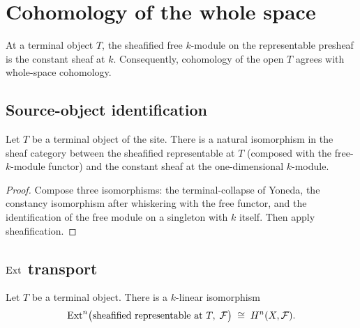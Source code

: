 \section{Cohomology of the whole space}
\label{mk-sec:cover_totality}

At a terminal object \(T\), the sheafified free \(k\)-module on the representable presheaf is the constant sheaf at \(k\). Consequently, cohomology of the open \(T\) agrees with whole-space cohomology.

\subsection{Source-object identification}

\begin{definition}\label{mk-def:Scheme_HModule_prime_top_sourceIso}
  \leanok


  Let \(T\) be a terminal object of the site. There is a natural isomorphism in the sheaf category between the sheafified representable at \(T\) (composed with the free-\(k\)-module functor) and the constant sheaf at the one-dimensional \(k\)-module.
\end{definition}

\begin{proof}
  \leanok


Compose three isomorphisms: the terminal-collapse of Yoneda, the constancy isomorphism after whiskering with the free functor, and the identification of the free module on a singleton with \(k\) itself. Then apply sheafification.
\end{proof}

\subsection{\(\operatorname{Ext}\) transport}

\begin{definition}\label{mk-def:Scheme_HModule_top_linearEquiv}
  \leanok


  Let \(T\) be a terminal object. There is a \(k\)-linear isomorphism
  \[
    \operatorname{Ext}^{n}\bigl(\text{sheafified representable at }T,\; \mathcal F\bigr) \;\cong\; H^{n}(X, \mathcal F).
  \]
\end{definition}


